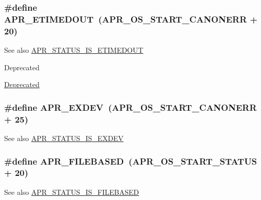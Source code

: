 \subsubsection[{\texorpdfstring{A\+P\+R\+\_\+\+E\+T\+I\+M\+E\+D\+O\+UT}{APR_ETIMEDOUT}}]{\setlength{\rightskip}{0pt plus 5cm}\#define A\+P\+R\+\_\+\+E\+T\+I\+M\+E\+D\+O\+UT~({\bf A\+P\+R\+\_\+\+O\+S\+\_\+\+S\+T\+A\+R\+T\+\_\+\+C\+A\+N\+O\+N\+E\+RR} + 20)}\hypertarget{group__APR__Error_ga6aeccbe9accb34f0adc1cb1ab9a82a8d}{}\label{group__APR__Error_ga6aeccbe9accb34f0adc1cb1ab9a82a8d}
\begin{DoxySeeAlso}{See also}
\hyperlink{group__APR__STATUS__IS_ga6adc2f539eabedb504294458be4f6251}{A\+P\+R\+\_\+\+S\+T\+A\+T\+U\+S\+\_\+\+I\+S\+\_\+\+E\+T\+I\+M\+E\+D\+O\+UT} 
\end{DoxySeeAlso}
\begin{DoxyRefDesc}{Deprecated}
\item[\hyperlink{deprecated__deprecated000008}{Deprecated}]\end{DoxyRefDesc}
\subsubsection[{\texorpdfstring{A\+P\+R\+\_\+\+E\+X\+D\+EV}{APR_EXDEV}}]{\setlength{\rightskip}{0pt plus 5cm}\#define A\+P\+R\+\_\+\+E\+X\+D\+EV~({\bf A\+P\+R\+\_\+\+O\+S\+\_\+\+S\+T\+A\+R\+T\+\_\+\+C\+A\+N\+O\+N\+E\+RR} + 25)}\hypertarget{group__APR__Error_ga0562023bd8ebe580b9bbb9f7b04d3f5d}{}\label{group__APR__Error_ga0562023bd8ebe580b9bbb9f7b04d3f5d}
\begin{DoxySeeAlso}{See also}
\hyperlink{group__APR__STATUS__IS_ga1a11d6ff007e40f93f9db1b3c6e76617}{A\+P\+R\+\_\+\+S\+T\+A\+T\+U\+S\+\_\+\+I\+S\+\_\+\+E\+X\+D\+EV} 
\end{DoxySeeAlso}
\subsubsection[{\texorpdfstring{A\+P\+R\+\_\+\+F\+I\+L\+E\+B\+A\+S\+ED}{APR_FILEBASED}}]{\setlength{\rightskip}{0pt plus 5cm}\#define A\+P\+R\+\_\+\+F\+I\+L\+E\+B\+A\+S\+ED~({\bf A\+P\+R\+\_\+\+O\+S\+\_\+\+S\+T\+A\+R\+T\+\_\+\+S\+T\+A\+T\+US} + 20)}\hypertarget{group__APR__Error_ga28a6d59b62d2698208451a9343399fbb}{}\label{group__APR__Error_ga28a6d59b62d2698208451a9343399fbb}
\begin{DoxySeeAlso}{See also}
\hyperlink{group__APR__STATUS__IS_ga7e46240d526e81f5ffbc266ca29b9f6a}{A\+P\+R\+\_\+\+S\+T\+A\+T\+U\+S\+\_\+\+I\+S\+\_\+\+F\+I\+L\+E\+B\+A\+S\+ED} 
\end{DoxySeeAlso}
